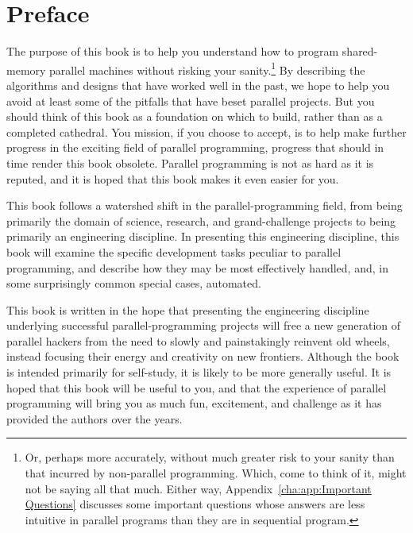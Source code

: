 
\chapter*{Preface}

The purpose of this book is to help you understand how to program
shared-memory parallel machines without risking your sanity.\footnote{
	Or, perhaps more accurately, without much greater risk to your
	sanity than that incurred by non-parallel programming.
	Which, come to think of it, might not be saying all that much.
	Either way, Appendix~\ref{cha:app:Important Questions} discusses
	some important questions whose answers are less intuitive in
	parallel programs than they are in sequential program.}
By describing the algorithms and designs that have worked well in
the past, we hope to help you avoid at least some of the pitfalls
that have beset parallel projects.
But you should think of this book as a foundation on which to build,
rather than as a completed cathedral.
You mission, if you choose to accept, is to help make further progress
in the exciting field of parallel programming, progress that should
in time render this book obsolete.
Parallel programming is not as hard as it is reputed, and it is hoped
that this book makes it even easier for you.

This book follows a watershed shift in the parallel-programming field,
from being primarily the domain of science, research, and grand-challenge
projects to being primarily an engineering discipline.
In presenting this engineering discipline, this book will examine
the specific development tasks peculiar to parallel programming,
and describe how they may be most effectively handled, and, in some
surprisingly common special cases, automated.

This book is written in the hope that presenting the engineering
discipline underlying successful
parallel-programming projects will free a new generation of parallel hackers
from the need to slowly and painstakingly reinvent old wheels, instead
focusing their energy and creativity on new frontiers.
Although the book is intended primarily for self-study, it is likely
to be more generally useful.
It is hoped that this book will be useful to you, and that the experience
of parallel programming will bring you as much fun, excitement, and
challenge as it has provided the authors over the years.
